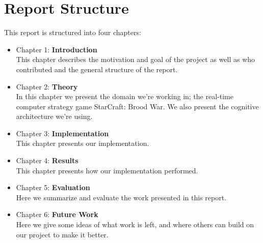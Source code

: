 \section{Report Structure}
\label{sec:structure}
This report is structured into four chapters:
\begin{itemize}
\item Chapter 1: \textbf{Introduction} \\
This chapter describes the motivation and goal of the project as well as who
contributed and the general structure of the report.
\item Chapter 2: \textbf{Theory} \\
In this chapter we present the domain we're working in; the real-time computer strategy game StarCraft: Brood War. We also present the cognitive architecture we're using.
\item Chapter 3: \textbf{Implementation} \\
This chapter presents our implementation.
\item Chapter 4: \textbf{Results} \\
This chapter presents how our implementation performed.
\item Chapter 5: \textbf{Evaluation} \\
Here we summarize and evaluate the work presented in this report.
\item Chapter 6: \textbf{Future Work} \\
Here we give some ideas of what work is left, and where others can build on our project to make it better.

\end{itemize}